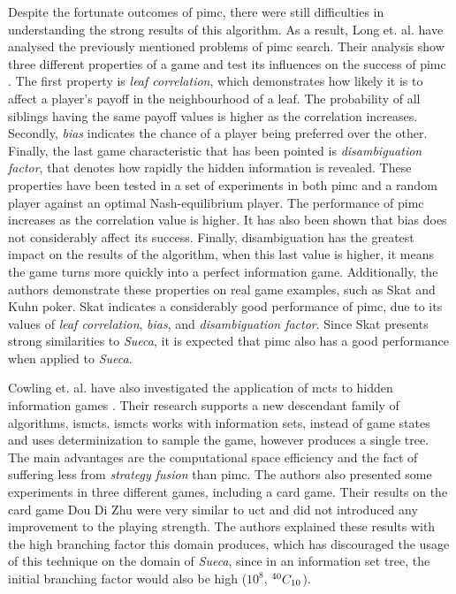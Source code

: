 Despite the fortunate outcomes of \gls{pimc}, there were still difficulties in understanding the strong results of this algorithm.
As a result, Long et. al. have analysed the previously mentioned problems of \gls{pimc} search.
Their analysis show three different properties of a game and test its influences on the success of \gls{pimc} \cite{Long2010}.
The first property is \emph{leaf correlation}, which demonstrates how likely it is to affect a player's payoff in the neighbourhood of a leaf.
The probability of all siblings having the same payoff values is higher as the correlation increases.
Secondly, \emph{bias} indicates the chance of a player being preferred over the other.
Finally, the last game characteristic that has been pointed is \emph{disambiguation factor}, that denotes how rapidly the hidden information is revealed.
These properties have been tested in a set of experiments in both \gls{pimc} and a random player against an optimal Nash-equilibrium player.
The performance of \gls{pimc} increases as the correlation value is higher.
It has also been shown that bias does not considerably affect its success.
Finally, disambiguation has the greatest impact on the results of the algorithm, when this last value is higher, it means the game turns more quickly into a perfect information game.
Additionally, the authors demonstrate these properties on real game examples, such as Skat and Kuhn poker.
Skat indicates a considerably good performance of \gls{pimc}, due to its values of \emph{leaf correlation}, \emph{bias}, and \emph{disambiguation factor}.
Since Skat presents strong similarities to \emph{Sueca}, it is expected that \gls{pimc} also has a good performance when applied to \emph{Sueca}.


Cowling et. al. have also investigated the application of \gls{mcts} to hidden information games \cite{Cowling2012}.
Their research supports a new descendant family of algorithms, \gls{ismcts}.
\gls{ismcts} works with information sets, instead of game states and uses determinization to sample the game, however produces a single tree.
The main advantages are the computational space efficiency and the fact of suffering less from \emph{strategy fusion} than \gls{pimc}.
The authors also presented some experiments in three different games, including a card game.
Their results on the card game Dou Di Zhu were very similar to \gls{uct} and did not introduced any improvement to the playing strength.
The authors explained these results with the high branching factor this domain produces, which has discouraged the usage of this technique on the domain of \emph{Sueca}, since in an information set tree, the initial branching factor would also be high ($10^{8}$, ${}^{40}C_{10}$).


